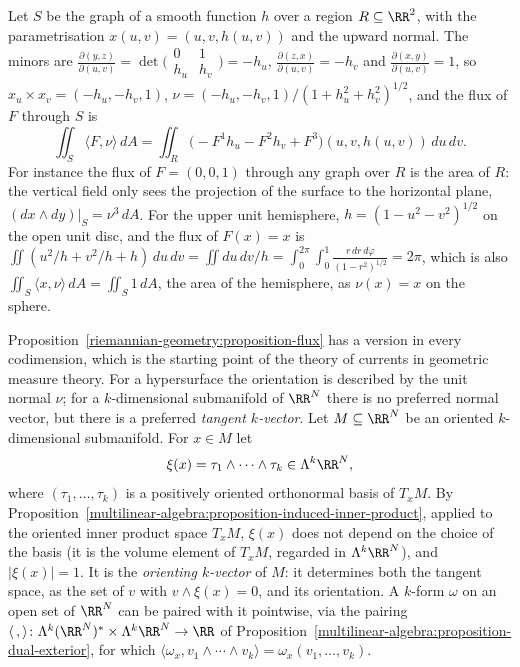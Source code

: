 \begin{example}\label{riemannian-geometry:example-flux-graph}
Let $S$ be the graph of a smooth function $h$ over a region $R \subseteq \RR^2$, with the parametrisation $x(u, v) = (u, v, h(u, v))$ and the upward normal. The minors are
$\frac{\partial(y, z)}{\partial(u, v)} = \det\bigl(\begin{smallmatrix} 0 & 1\\ h_u & h_v\end{smallmatrix}\bigr) = -h_u$, $\frac{\partial(z, x)}{\partial(u, v)} = -h_v$ and $\frac{\partial(x, y)}{\partial(u, v)} = 1$, so
$x_u \times x_v = (-h_u, -h_v, 1)$, $\nu = (-h_u, -h_v, 1)/(1 + h_u^2 + h_v^2)^{1/2}$, and the flux of $F$ through $S$ is
\[
\iint_S\langle F, \nu\rangle\,dA = \iint_R\bigl(-F^1h_u - F^2h_v + F^3\bigr)(u, v, h(u, v))\,du\,dv .
\]
For instance the flux of $F = (0, 0, 1)$ through any graph over $R$ is the area of $R$: the vertical field only sees the projection of the surface to the horizontal plane, $(dx \wedge dy)|_S = \nu^3\,dA$.
For the upper unit hemisphere, $h = (1 - u^2 - v^2)^{1/2}$ on the open unit disc, and the flux of $F(x) = x$ is
$\iint(u^2/h + v^2/h + h)\,du\,dv = \iint du\,dv/h = \int_0^{2\pi}\!\!\int_0^1\frac{r\,dr\,d\varphi}{(1 - r^2)^{1/2}} = 2\pi$, which is also $\iint_S\langle x, \nu\rangle\,dA = \iint_S1\,dA$, the area of the hemisphere,
as $\nu(x) = x$ on the sphere.
\end{example}

Proposition~\ref{riemannian-geometry:proposition-flux} has a version in every codimension, which is the starting point of the theory of currents in geometric measure theory. For a hypersurface the
orientation is described by the unit normal $\nu$; for a $k$-dimensional submanifold of $\RR^N$ there is no preferred normal vector, but there is a preferred \emph{tangent $k$-vector}. Let
$M \subseteq \RR^N$ be an oriented $k$-dimensional submanifold. For $x \in M$ let
\[
\xi(x) = \tau_1 \wedge \cdots \wedge \tau_k \in \Lambda^k\RR^N,
\]
where $(\tau_1, \ldots, \tau_k)$ is a positively oriented orthonormal basis of $T_xM$. By Proposition~\ref{multilinear-algebra:proposition-induced-inner-product}, applied to the oriented inner
product space $T_xM$, $\xi(x)$ does not depend on the choice of the basis (it is the volume element of $T_xM$, regarded in $\Lambda^k\RR^N$), and $|\xi(x)| = 1$. It is the \emph{orienting $k$-vector}
of $M$: it determines both the tangent space, as the set of $v$ with $v \wedge \xi(x) = 0$, and its orientation. A $k$-form $\omega$ on an open set of $\RR^N$ can be paired with it pointwise, via the
pairing $\langle\,,\rangle \colon \Lambda^k(\RR^N)^* \times \Lambda^k\RR^N \to \RR$ of Proposition~\ref{multilinear-algebra:proposition-dual-exterior}, for which
$\langle\omega_x, v_1 \wedge \cdots \wedge v_k\rangle = \omega_x(v_1, \ldots, v_k)$.

